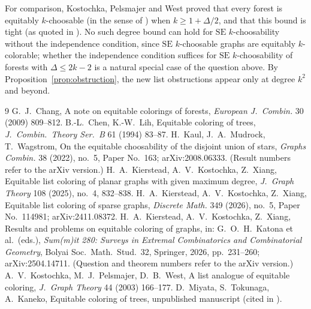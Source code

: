 \documentclass[11pt]{article}
\theoremstyle{definition}
\newcommand{\SE}{\mathrm{SE}}
\begin{document}
For comparison, Kostochka, Pelsmajer and West \cite{KPW} proved that every forest is
equitably $k$-choosable (in the sense of \cite{KPW}) when $k\ge 1+\Delta/2$, and that
this bound is tight (as quoted in \cite{KMW}). No such degree bound can hold for $\SE$
$k$-choosability without the independence condition, since $\SE$ $k$-choosable graphs
are equitably $k$-colorable; whether the independence condition suffices for
$\SE$ $k$-choosability of forests with $\Delta\le 2k-2$ is a natural special case of
the question above. By Proposition~\ref{prop:obstruction}, the new list obstructions
appear only at degree $k^2$ and beyond.

\begin{thebibliography}{9}
 G.~J.~Chang, A note on equitable colorings of forests,
  \emph{European J.~Combin.} 30 (2009) 809--812.
 B.-L.~Chen, K.-W.~Lih, Equitable coloring of trees,
  \emph{J.~Combin.\ Theory Ser.~B} 61 (1994) 83--87.
 H.~Kaul, J.~A.~Mudrock, T.~Wagstrom, On the equitable choosability of the
  disjoint union of stars, \emph{Graphs Combin.} 38 (2022), no.~5, Paper No.~163;
  arXiv:2008.06333. (Result numbers refer to the arXiv version.)
 H.~A.~Kierstead, A.~V.~Kostochka, Z.~Xiang, Equitable list coloring
  of planar graphs with given maximum degree, \emph{J.~Graph Theory} 108 (2025), no.~4,
  832--838.
 H.~A.~Kierstead, A.~V.~Kostochka, Z.~Xiang, Equitable list coloring
  of sparse graphs, \emph{Discrete Math.} 349 (2026), no.~5, Paper No.~114981;
  arXiv:2411.08372.
 H.~A.~Kierstead, A.~V.~Kostochka, Z.~Xiang, Results and problems on
  equitable coloring of graphs, in: G.~O.~H.~Katona et al.\ (eds.), \emph{Sum(m)it 280:
  Surveys in Extremal Combinatorics and Combinatorial Geometry}, Bolyai Soc.\ Math.\
  Stud.\ 32, Springer, 2026, pp.~231--260; arXiv:2504.14711. (Question and theorem
  numbers refer to the arXiv version.)
 A.~V.~Kostochka, M.~J.~Pelsmajer, D.~B.~West, A list analogue of equitable
  coloring, \emph{J.~Graph Theory} 44 (2003) 166--177.
 D.~Miyata, S.~Tokunaga, A.~Kaneko, Equitable coloring of trees, unpublished
  manuscript (cited in \cite{Chang,KKXsurvey}).
\end{thebibliography}
\end{document}
